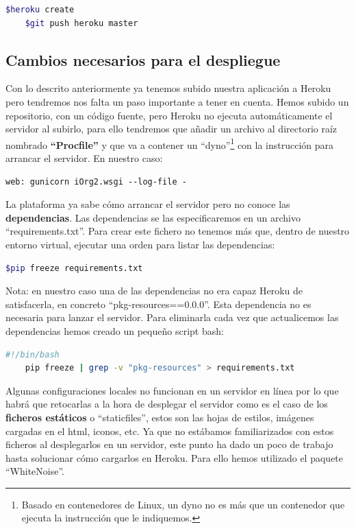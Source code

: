  \begin{lstlisting}[language=bash]
    $heroku create
    $git push heroku master
  \end{lstlisting}


\subsection{Cambios necesarios para el despliegue}

\bigskip
  Con lo descrito anteriormente ya tenemos subido nuestra aplicación a Heroku pero tendremos nos falta un paso importante a tener en cuenta. Hemos subido un repositorio, con un código fuente, pero Heroku no ejecuta automáticamente el servidor al subirlo, para ello tendremos que añadir un archivo al directorio raíz nombrado \textbf{``Procfile''} y que va a contener un ``dyno''\footnote{Basado en contenedores de Linux, un dyno no es más que un contenedor que ejecuta la instrucción que le indiquemos.} con la instrucción para arrancar el servidor. En nuestro caso: 

  \begin{lstlisting}[language=text]
    web: gunicorn iOrg2.wsgi --log-file -
  \end{lstlisting}

\bigskip
La plataforma ya sabe cómo arrancar el servidor pero no conoce las \textbf{dependencias}. Las dependencias se las especificaremos en un archivo ``requirements.txt''. Para crear este fichero no tenemos más que, dentro de nuestro entorno virtual, ejecutar una orden para listar las dependencias:

\begin{lstlisting}[language=bash]
    $pip freeze requirements.txt
\end{lstlisting}

\bigskip
Nota: en nuestro caso una de las dependencias no era capaz Heroku de satisfacerla, en concreto ``pkg-resources==0.0.0''. Esta dependencia no es necesaria para lanzar el servidor. Para eliminarla cada vez que actualicemos las dependencias hemos creado un pequeño script bash:

\begin{lstlisting}[language=bash]
    #!/bin/bash
    pip freeze | grep -v "pkg-resources" > requirements.txt
\end{lstlisting}


\bigskip
  Algunas configuraciones locales no funcionan en un servidor en línea por lo que habrá que retocarlas a la hora de desplegar el servidor como es el caso de los \textbf{ficheros estáticos} o ``staticfiles'', estos son las hojas de estilos, imágenes cargadas en el html, iconos, etc. Ya que no estábamos familiarizados con estos ficheros al desplegarlos en un servidor, este punto ha dado un poco de trabajo hasta solucionar cómo cargarlos en Heroku. Para ello hemos utilizado el paquete ``WhiteNoise''.

